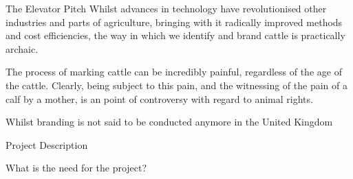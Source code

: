 

\begin{subsection}{The Elevator Pitch}
  Whilst advances in technology have revolutionised other industries and parts of agriculture, bringing with it radically improved methods and cost efficiencies, the way in which we identify and brand cattle is practically archaic.

  The process of marking cattle can be incredibly painful, regardless of the age of the cattle. Clearly, being subject to this pain, and the witnessing of the pain of a calf by a mother, is an point of controversy with regard to animal rights.

  Whilst branding is not said to be conducted anymore in the United Kingdom \cite{theguardian-1}

  \begin{center}
  \end{center}
\end{subsection}


\begin{subsection}{Project Description}

\end{subsection}


\begin{subsection}{What is the need for the project?}

\end{subsection}
